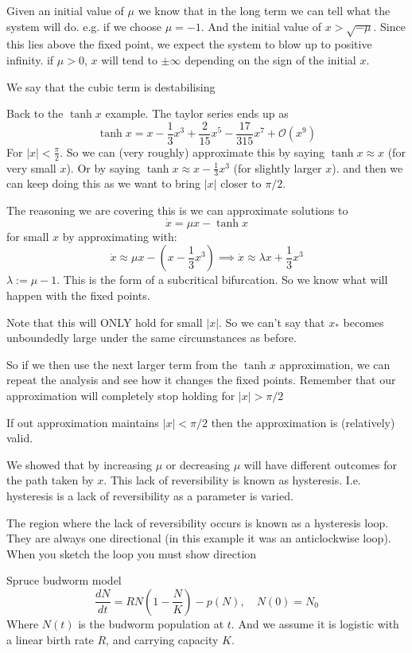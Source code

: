 \documentclass{/home/janmebows/Documents/LatexTemplates/myassignment}
\begin{document}
Given an initial value of $\mu$ we know that in the long term we can tell what the system will do. e.g. if we choose $\mu = -1$. And the initial value of $x > \sqrt{-\mu}$. Since this lies above the fixed point, we expect the system to blow up to positive infinity. if $\mu > 0$, $x$ will tend to $\pm \infty$ depending on the sign of the initial $x$.

We say that the cubic term is destabilising

Back to the $\tanh x$ example. The taylor series ends up as
\[\tanh x = x - \frac13 x^3 + \frac2{15} x^5 - \frac{17}{315} x^7 + \mathcal{O}(x^9)\]
For $|x| < \frac{\pi}{2}$.
So we can (very roughly) approximate this by saying $\tanh x \approx x$ (for very small $x$). Or by saying
$\tanh x \approx x - \frac13 x^3$ (for slightly larger $x$). and then we can keep doing this as we want to bring $|x|$ closer to $\pi/2$.

The reasoning we are covering this is we can approximate solutions to
\[\dot{x} = \mu x - \tanh x\]
for small $x$ by approximating with:
\[\dot{x} \approx \mu x - (x - \frac13 x^3) \implies \dot{x} \approx \lambda x + \frac13 x^3\]
$\lambda := \mu -1$. This is the form of a subcritical bifurcation. So we know what will happen with the fixed points. 

Note that this will ONLY hold for small $|x|$. So we can't say that $x_*$ becomes unboundedly large under the same circumstances as before.

So if we then use the next larger term from the $\tanh x$ approximation, we can repeat the analysis and see how it changes the fixed points.
Remember that our approximation will completely stop holding for $|x| > \pi/2$

If out approximation maintains $|x| < \pi /2$ then the approximation is (relatively) valid.


We showed that by increasing $\mu$ or decreasing $\mu$ will have different outcomes for the path taken by $x$. This lack of reversibility is known as hysteresis. I.e. hysteresis is a lack of reversibility as a parameter is varied.



The region where the lack of reversibility occurs is known as a hysteresis loop. They are always one directional (in this example it was an anticlockwise loop). When you sketch the loop you must show direction


Spruce budworm model
\[\frac{dN}{dt} = RN(1 - \frac{N}{K}) - p(N), \quad N(0) = N_0\]
Where $N(t)$ is the budworm population at $t$. And we assume it is logistic with a linear birth rate $R$, and carrying capacity $K$.
\end{document}
